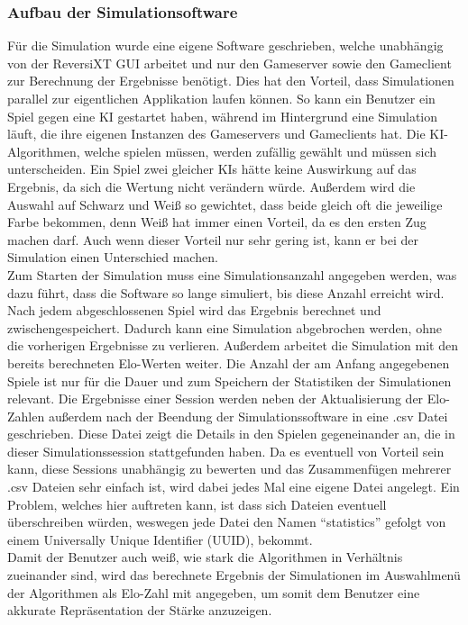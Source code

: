 \documentclass[12pt,a4paper,bibliography=totocnumbered,listof=totocnumbered]{article}
\begin{document}
\subsubsection{Aufbau der Simulationsoftware}
Für die Simulation wurde eine eigene Software geschrieben, welche unabhängig von der ReversiXT GUI arbeitet und nur den Gameserver 
sowie den Gameclient zur Berechnung der Ergebnisse benötigt. Dies hat den Vorteil, dass Simulationen parallel zur eigentlichen Applikation laufen können.
So kann ein Benutzer ein Spiel gegen eine KI gestartet haben, während im Hintergrund eine Simulation läuft, die ihre eigenen Instanzen des 
Gameservers und Gameclients hat. 
Die KI-Algorithmen, welche spielen müssen, werden zufällig gewählt und müssen sich unterscheiden. Ein Spiel zwei gleicher KIs hätte keine Auswirkung auf das 
Ergebnis, da sich die Wertung nicht verändern würde. Außerdem wird die Auswahl auf Schwarz und Weiß so gewichtet, dass beide gleich oft die jeweilige Farbe bekommen, 
denn Weiß hat immer einen Vorteil, da es den ersten Zug machen darf. Auch wenn dieser 
Vorteil nur sehr gering ist, kann er bei der Simulation einen Unterschied machen.
\\
Zum Starten der Simulation muss eine Simulationsanzahl angegeben werden, was dazu führt, dass die Software so lange simuliert, bis diese Anzahl erreicht wird.
Nach jedem abgeschlossenen Spiel wird das Ergebnis berechnet und zwischengespeichert. Dadurch kann eine Simulation abgebrochen werden, ohne die vorherigen 
Ergebnisse zu verlieren. Außerdem arbeitet die Simulation mit den bereits berechneten Elo-Werten weiter. Die Anzahl der am Anfang angegebenen 
Spiele ist nur für die Dauer und zum Speichern der Statistiken der Simulationen relevant. 
Die Ergebnisse einer Session werden neben der Aktualisierung der Elo-Zahlen außerdem nach der Beendung der Simulationssoftware in eine .csv Datei 
geschrieben. Diese Datei zeigt die Details in den Spielen gegeneinander an, die in dieser Simulationssession stattgefunden haben.
Da es eventuell von Vorteil sein kann, diese Sessions unabhängig zu bewerten und das Zusammenfügen mehrerer .csv Dateien sehr einfach ist, 
wird dabei jedes Mal eine eigene Datei angelegt. Ein Problem, welches hier auftreten kann, ist dass sich Dateien eventuell überschreiben würden, weswegen 
jede Datei den Namen ``statistics'' gefolgt von einem Universally Unique Identifier (UUID), bekommt.
\\
Damit der Benutzer auch weiß, wie stark die Algorithmen in Verhältnis zueinander sind, wird das berechnete Ergebnis der Simulationen im Auswahlmenü der 
Algorithmen als Elo-Zahl mit angegeben, um somit dem Benutzer eine akkurate Repräsentation der Stärke anzuzeigen.
\end{document}
